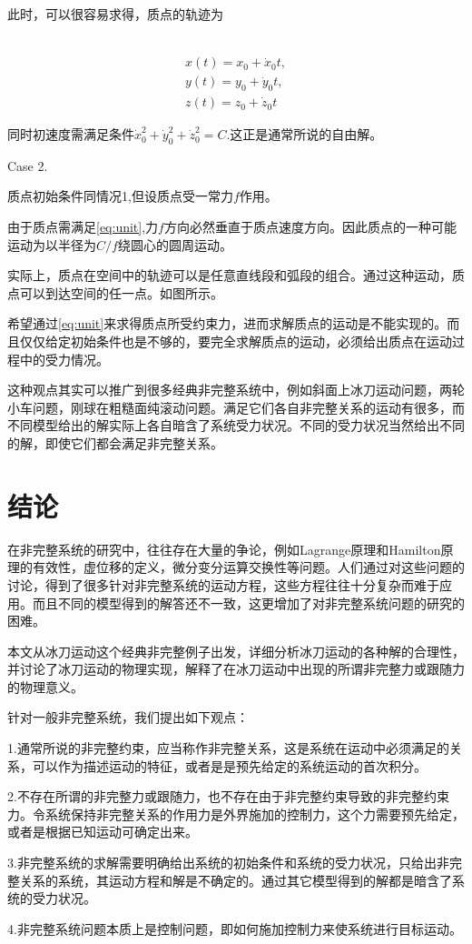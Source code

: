 \documentclass{ctexart}
\begin{document}
此时，可以很容易求得，质点的轨迹为

\
\begin{eqnarray}
  \label{eq:unitsol}
  x(t) = x_0 + \dot{x}_0 t,\\
  y(t) = y_0 + \dot{y}_0 t,\\
  z(t) = z_0 + \dot{z}_0 t
\end{eqnarray}

同时初速度需满足条件$\dot{x}_0^2+\dot{y}_0^2+\dot{z}_0^2 = C$.这正是通常所说的自由解。

Case 2.

质点初始条件同情况1,但设质点受一常力$f$作用。

由于质点需满足\eqref{eq:unit},力$f$方向必然垂直于质点速度方向。因此质点的一种可能运动为以半径为$C/f$绕圆心的圆周运动。


实际上，质点在空间中的轨迹可以是任意直线段和弧段的组合。通过这种运动，质点可以到达空间的任一点。如图所示。

希望通过\eqref{eq:unit}来求得质点所受约束力，进而求解质点的运动是不能实现的。而且仅仅给定初始条件也是不够的，要完全求解质点的运动，必须给出质点在运动过程中的受力情况。


这种观点其实可以推广到很多经典非完整系统中，例如斜面上冰刀运动问题，两轮小车问题，刚球在粗糙面纯滚动问题。满足它们各自非完整关系的运动有很多，而不同模型给出的解实际上各自暗含了系统受力状况。不同的受力状况当然给出不同的解，即使它们都会满足非完整关系。


\section{结论}
\label{sec:conclusion}

在非完整系统的研究中，往往存在大量的争论，例如Lagrange原理和Hamilton原理的有效性，虚位移的定义，微分变分运算交换性等问题。人们通过对这些问题的讨论，得到了很多针对非完整系统的运动方程，这些方程往往十分复杂而难于应用。而且不同的模型得到的解答还不一致，这更增加了对非完整系统问题的研究的困难。

本文从冰刀运动这个经典非完整例子出发，详细分析冰刀运动的各种解的合理性，并讨论了冰刀运动的物理实现，解释了在冰刀运动中出现的所谓非完整力或跟随力的物理意义。

针对一般非完整系统，我们提出如下观点：

1.通常所说的非完整约束，应当称作非完整关系，这是系统在运动中必须满足的关系，可以作为描述运动的特征，或者是是预先给定的系统运动的首次积分。

2.不存在所谓的非完整力或跟随力，也不存在由于非完整约束导致的非完整约束力。令系统保持非完整关系的作用力是外界施加的控制力，这个力需要预先给定，或者是根据已知运动可确定出来。

3.非完整系统的求解需要明确给出系统的初始条件和系统的受力状况，只给出非完整关系的系统，其运动方程和解是不确定的。通过其它模型得到的解都是暗含了系统的受力状况。

4.非完整系统问题本质上是控制问题，即如何施加控制力来使系统进行目标运动。
\end{document}
